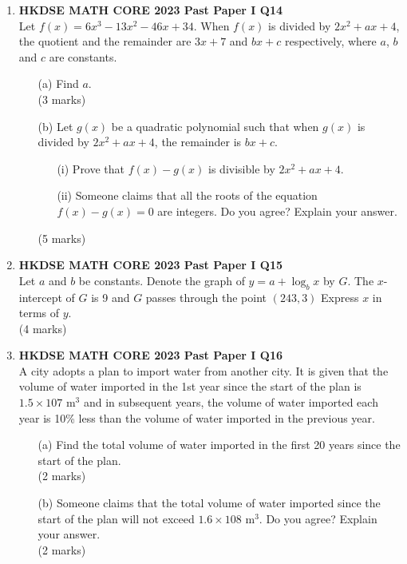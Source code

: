 \documentclass[12pt]{article}
\begin{document}
\begin{enumerate}
	\item \textbf{HKDSE MATH CORE 2023 Past Paper I Q14}\\
	Let $f(x) = 6x^3 - 13x^2 - 46x + 34$. When $f(x)$ is divided by $2x^2 + ax + 4$, the quotient and the remainder are $3x + 7$ and $bx + c$ respectively, where $a$, $b$ and $c$ are constants.
	\begin{enumerate}
		\item[(a)] Find $a$. \\(3 marks)
		\item[(b)] Let $g(x)$ be a quadratic polynomial such that when $g(x)$ is divided by $2x^2 + ax + 4$, the remainder is $bx + c$.
		\begin{enumerate}
			\item[(i)] Prove that  $f(x) - g(x)$ is divisible by $2x^2 + ax + 4$.
			\item[(ii)] Someone claims that all the roots of the equation  $f(x) - g(x) = 0$ are integers. Do you agree? Explain your answer.
		\end{enumerate}
		(5 marks)
	\end{enumerate}

	\item \textbf{HKDSE MATH CORE 2023 Past Paper I Q15}\\
	Let $a$ and $b$ be constants. Denote the graph of $y = a + \log_b{x}$ by $G$. The $x$-intercept of $G$ is 9 and $G$ passes through the point $(243, 3)$ Express $x$ in terms of $y$. \\(4 marks)

	\item \textbf{HKDSE MATH CORE 2023 Past Paper I Q16}\\
	A city adopts a plan to import water from another city. It is given that the volume of water imported in the 1st year since the start of the plan is $1.5 \times 107$ m$^3$ and in subsequent years, the volume of water imported each year is 10\% less than the volume of water imported in the previous year.
	\begin{enumerate}
		\item[(a)] Find the total volume of water imported in the first 20 years since the start of the plan. \\(2 marks) 
		\item[(b)] Someone claims that the total volume of water imported since the start of the plan will not exceed $1.6 \times 108$ m$^3$. Do you agree? Explain your answer. \\ (2 marks)
	\end{enumerate}


\end{enumerate}
\end{document}
